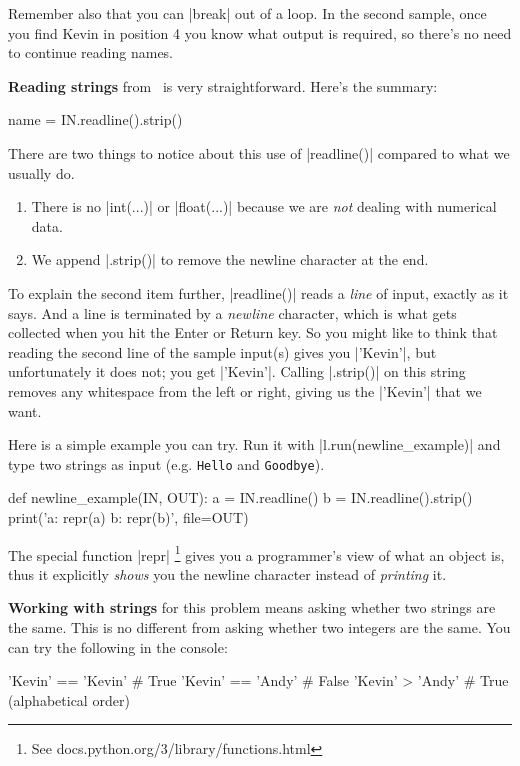 Remember also that you can \pycode|break| out of a loop. In the second sample, once you
find Kevin in position 4 you know what output is required, so there's no need to continue
reading names.

\textbf{Reading strings} from \IN\ is very straightforward. Here's the summary:
\begin{pythoncode}
  name = IN.readline().strip()
\end{pythoncode}

There are two things to notice about this use of \pycode|readline()| compared to what
we usually do.
\begin{enumerate}
  \item There is no \pycode|int(...)| or \pycode|float(...)| because we are \emph{not}
    dealing with numerical data.
  \item We append \pycode|.strip()| to remove the newline character at the end.
\end{enumerate}

To explain the second item further, \pycode|readline()| reads a \emph{line} of input,
exactly as it says. And a line is terminated by a \emph{newline} character, which is what
gets collected when you hit the Enter or Return key. So you might like to think that
reading the second line of the sample input(s) gives you \pycode|'Kevin'|, but
unfortunately it does not; you get \pycode|'Kevin\n'|. Calling \pycode|.strip()| on this
string removes any whitespace from the left or right, giving us the \pycode|'Kevin'| that
we want.

Here is a simple example you can try. Run it with \pycode|l.run(newline_example)| and type
two strings as input (e.g. \texttt{Hello} and \texttt{Goodbye}).
\begin{pythoncode}
  def newline_example(IN, OUT):
    a = IN.readline()
    b = IN.readline().strip()
    print('a: {repr(a)}  b: {repr(b)}', file=OUT)
\end{pythoncode}

The special function \pycode|repr|%
\footnote{See docs.python.org/3/library/functions.html}
gives you a programmer's view of what an object is, thus it explicitly \emph{shows} you
the newline character instead of \emph{printing} it.

\textbf{Working with strings} for this problem means asking whether two strings are the
same. This is no different from asking whether two integers are the same. You can try the
following in the console:
\begin{pythoncode}
  'Kevin' == 'Kevin'        # True
  'Kevin' == 'Andy'         # False
  'Kevin' > 'Andy'          # True (alphabetical order)
\end{pythoncode}

